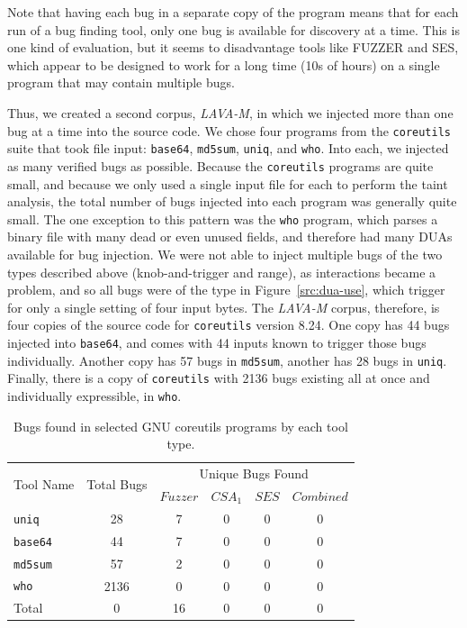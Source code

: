 Note that having each bug in a separate copy of the program means that for each run of a bug finding tool, only one bug is available for discovery at a time.  
This is one kind of evaluation, but it seems to disadvantage tools like FUZZER and SES, which appear to be designed to work for a long time (10s of hours) on a single program that may contain multiple bugs. 

Thus, we created a second corpus, \emph{LAVA-M}, in which we injected more than one bug at a time into the source code.
We chose four programs from the \verb+coreutils+ suite that took file input: \verb+base64+, \verb+md5sum+, \verb+uniq+, and \verb+who+.
Into each, we injected as many verified bugs as possible.
Because the \verb+coreutils+ programs are quite small, and because we only used a single input file for each to perform the taint analysis, the total number of bugs injected into each program was generally quite small.
The one exception to this pattern was the \verb+who+ program, which parses a binary file with many dead or even unused fields, and therefore had many DUAs available for bug injection.
We were not able to inject multiple bugs of the two types described above (knob-and-trigger and range), as interactions became a problem, and so all bugs were of the type in Figure~\ref{src:dua-use}, which trigger for only a single setting of four input bytes.  
The \emph{LAVA-M} corpus, therefore, is four copies of the source code for \verb+coreutils+ version 8.24.
One copy has 44 bugs injected into \verb+base64+, and comes with 44 inputs known to trigger those bugs individually.
Another copy has 57 bugs in \verb+md5sum+, another has 28 bugs in \verb+uniq+.
Finally, there is a copy of \verb+coreutils+ with 2136 bugs existing all at once and individually expressible, in \verb+who+.


\begin{table}[h]
\centering
\begin{tabular}{l|c|c|c|c|c} 
\multirow{2}{*}{Tool Name} & \multirow{2}{*}{Total Bugs} & \multicolumn{4}{c}{Unique Bugs Found} \\
              &            & $Fuzzer$    & $CSA_1$      & $SES$      & $Combined$ \\ \hline 
\verb+uniq+   &    28      & 7           & 0            & 0          & 0               \\
\verb+base64+ &    44      & 7           & 0            & 0          & 0               \\
\verb+md5sum+ &    57      & 2           & 0            & 0          & 0               \\
\verb+who+    &    2136    & 0           & 0            & 0          & 0               \\
Total         &    0       & 16          & 0            & 0          & 0               \\
\end{tabular}
\caption{Bugs found in selected GNU coreutils programs by each tool type.}
\label{table:tool-eval-results-coreutils}
\end{table}

